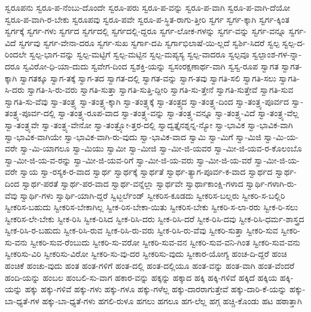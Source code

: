 {ಸ್ವರೂಪನು
ಸ್ವರೂ-ಪ-ನೆಂಬು-ದೊಂದೇ
ಸ್ವರೂ-ಪರು
ಸ್ವರೂ-ಪ-ವನ್ನು
ಸ್ವರೂ-ಪ-ವಾಗಿ
ಸ್ವರೂ-ಪ-ವಾಗಿ-ದೆಯೋ
ಸ್ವರೂ-ಪ-ವಾಗಿ-ರ-ಬೇಕು
ಸ್ವರೂಪವು
ಸ್ವರೂ-ಪವೇ
ಸ್ವರೂ-ಪ-ಸ್ಥಿತ-ರಾಗು-ತ್ತೀರಿ
ಸ್ವರ್ಗ
ಸ್ವರ್ಗ-ಕ್ಕಾಗಿ
ಸ್ವರ್ಗ-ಕ್ಕಿಂತ
ಸ್ವರ್ಗಕ್ಕೆ
ಸ್ವರ್ಗ-ಗಳು
ಸ್ವರ್ಗದ
ಸ್ವರ್ಗದಲ್ಲಿ
ಸ್ವರ್ಗದಲ್ಲಿ-ದ್ದರೂ
ಸ್ವರ್ಗ-ಲೋಕ-ಗಳನ್ನು
ಸ್ವರ್ಗ-ವನ್ನು
ಸ್ವರ್ಗ-ವನ್ನೂ
ಸ್ವರ್ಗ-ವಿದೆ
ಸ್ವರ್ಗವು
ಸ್ವರ್ಗ-ವೇನಾ-ದರೂ
ಸ್ವರ್ಗ-ಸುಖ
ಸ್ವರ್ಗಾ-ದಪಿ
ಸ್ವರ್ಗಾಭಿಲಾಷೆ-ಯಿ-ಲ್ಲದೆ
ಸ್ವರ್ಶಿ-ಸಿದರೆ
ಸ್ವಲ್ಪ
ಸ್ವಲ್ಪ-ದ-ರಿಂದಲೇ
ಸ್ವಲ್ಪ-ಭಾಗ-ವನ್ನು
ಸ್ವಲ್ಪ-ಮಟ್ಟಿಗೆ
ಸ್ವಲ್ಪ-ಮಟ್ಟಿನ
ಸ್ವಲ್ಪ-ಮಪ್ಯಸ್ಯ
ಸ್ವಲ್ಪ-ವಾದರೂ
ಸ್ವಲ್ಪವೂ
ಸ್ವಲ್ಪಾಂಶ-ಗಳ-ನ್ನಾ-ದರೂ
ಸ್ವವಿರೋ-ಧಿ-ಯಾ-ದುದು
ಸ್ವವೇಗ-ದಿಂದ
ಸ್ವಶಕ್ತಿ-ಯನ್ನು
ಸ್ವಸಂರಕ್ಷಣಾರ್ಥ-ವಾಗಿ
ಸ್ವಸ್ವ-ರೂಪ
ಸ್ವಾಗತ
ಸ್ವಾಗತ-ಕ್ಕಾಗಿ
ಸ್ವಾಗತಕ್ಕೂ
ಸ್ವಾಗ-ತಕ್ಕೆ
ಸ್ವಾಗ-ತದ
ಸ್ವಾಗತ-ದಲ್ಲಿ
ಸ್ವಾಗತ-ವನ್ನು
ಸ್ವಾಗ-ತವು
ಸ್ವಾಗತಿ-ಸಲಿ
ಸ್ವಾಗತಿ-ಸಲು
ಸ್ವಾಗತಿ-ಸಿ-ದರು
ಸ್ವಾಗತಿ-ಸಿ-ರು-ವರು
ಸ್ವಾಗತಿ-ಸುತ್ತಾ
ಸ್ವಾಗತಿ-ಸುತ್ತಿ-ದ್ದೀರಿ
ಸ್ವಾಗತಿ-ಸು-ತ್ತೇನೆ
ಸ್ವಾಗತಿ-ಸುತ್ತೇವೆ
ಸ್ವಾಗತಿ-ಸುವ
ಸ್ವಾಗತಿ-ಸು-ವೆವು
ಸ್ವಾ-ತಂತ್ರ್ಯ
ಸ್ವಾ-ತಂತ್ರ್ಯ-ಕ್ಕಾಗಿ
ಸ್ವಾ-ತಂತ್ರ್ಯಕ್ಕೆ
ಸ್ವಾ-ತಂತ್ರ್ಯದ
ಸ್ವಾ-ತಂತ್ರ್ಯ-ದಿಂದ
ಸ್ವಾ-ತಂತ್ರ್ಯ-ಪೂರ್ವದ
ಸ್ವಾ-ತಂತ್ರ್ಯ-ಪೂರ್ವ-ದಲ್ಲಿ
ಸ್ವಾ-ತಂತ್ರ್ಯ-ರೂಪ-ವಾದ
ಸ್ವಾ-ತಂತ್ರ್ಯ-ವನ್ನು
ಸ್ವಾ-ತಂತ್ರ್ಯ-ವನ್ನೂ
ಸ್ವಾ-ತಂತ್ರ್ಯ-ವಿದೆ
ಸ್ವಾ-ತಂತ್ರ್ಯ-ವೆಲ್ಲ
ಸ್ವಾ-ತಂತ್ರ್ಯವೇ
ಸ್ವಾ-ತಂತ್ರ್ಯ-ವೇನೋ
ಸ್ವಾ-ತಂತ್ರ್ಯೋ-ತ್ತರ-ದಲ್ಲಿ
ಸ್ವಾದ್ವತ್ತೈನಶ್ನನ್ನ-ನ್ಯೋ
ಸ್ವಾ-ಭಾವಿಕ
ಸ್ವಾ-ಭಾವಿಕ-ವಾಗಿ
ಸ್ವಾ-ಭಾವಿಕ-ವಾಗಿಯೇ
ಸ್ವಾ-ಭಾವಿಕ-ವಾಗಿ-ರು-ವುದು
ಸ್ವಾ-ಭಾವಿಕ-ವಾದ
ಸ್ವಾಮಿ
ಸ್ವಾ-ಮಿಗೆ
ಸ್ವಾ-ಮಿಜಿ
ಸ್ವಾ-ಮಿ-ಯ-ವರೇ
ಸ್ವಾ-ಮಿ-ಯಾಗಲೂ
ಸ್ವಾ-ಮಿಯು
ಸ್ವಾಮೀ
ಸ್ವಾ-ಮೀಜಿ
ಸ್ವಾ-ಮೀ-ಜಿ-ಯವರ
ಸ್ವಾ-ಮೀ-ಜಿ-ಯವ-ರ-ಕೊಲಂಬೊ
ಸ್ವಾ-ಮೀ-ಜಿ-ಯ-ವ-ರನ್ನು
ಸ್ವಾ-ಮೀ-ಜಿ-ಯವ-ರಿಗೆ
ಸ್ವಾ-ಮೀ-ಜಿ-ಯ-ವರು
ಸ್ವಾ-ಮೀ-ಜಿ-ಯ-ವರೆ
ಸ್ವಾ-ಮೀ-ಜಿ-ಯ-ವರೇ
ಸ್ವಾಯ
ಸ್ವಾ-ರಸ್ಯಕ-ರ-ವಾದ
ಸ್ವಾರ್ಥ
ಸ್ವಾರ್ಥಕ್ಕೆ
ಸ್ವಾರ್ಥತೆ
ಸ್ವಾರ್ಥ-ತ್ಯಾಗ-ಪೂರ್ವ-ಕ-ವಾದ
ಸ್ವಾರ್ಥದ
ಸ್ವಾರ್ಥ-ದಿಂದ
ಸ್ವಾರ್ಥ-ಪರತೆ
ಸ್ವಾರ್ಥ-ಪರ-ವಾದ
ಸ್ವಾರ್ಥ-ವನ್ನೆಲ್ಲಾ
ಸ್ವಾರ್ಥವೇ
ಸ್ವಾರ್ಥಾಕಾಂಕ್ಷಿ-ಗಳಾದ
ಸ್ವಾರ್ಥಿ-ಗಳಾಗಿ-ರು-ವೆವು
ಸ್ವಾರ್ಥಿ-ಗಳು
ಸ್ವಾರ್ಥಿ-ಯಾಗಿ-ದ್ದರೆ
ಸ್ವಿಟ್ಜರ್ಲೆಂಡ್
ಸ್ವೀಕರಿಸ-ಕೂಡದು
ಸ್ವೀಕರಿಸ-ಬಲ್ಲರು
ಸ್ವೀಕರಿ-ಸ-ಬಲ್ಲಿರಿ
ಸ್ವೀಕರಿಸ-ಬಹುದು
ಸ್ವೀಕರಿಸ-ಬೇಕಾಗಿಲ್ಲ
ಸ್ವೀಕ-ರಿಸ-ಬೇಕಾ-ಯಿತು
ಸ್ವೀಕರಿಸ-ಬೇಕು
ಸ್ವೀಕರಿ-ಸ-ಲಾ-ರರು
ಸ್ವೀಕ-ರಿ-ಸಲು
ಸ್ವೀಕರಿಸ-ಲೇ-ಬೇಕು
ಸ್ವೀಕ-ರಿಸಿ
ಸ್ವೀಕ-ರಿಸಿದ
ಸ್ವೀಕ-ರಿಸಿ-ದರು
ಸ್ವೀಕ-ರಿಸಿ-ದರೆ
ಸ್ವೀಕ-ರಿಸಿ-ದವು
ಸ್ವೀಕ-ರಿಸಿ-ಧರ್ಮ-ಶಾಸ್ತ್ರದ
ಸ್ವೀಕ-ರಿಸಿ-ರ-ಬಹುದು
ಸ್ವೀಕ-ರಿಸಿ-ರುವ
ಸ್ವೀಕ-ರಿಸಿ-ರು-ವರು
ಸ್ವೀಕ-ರಿಸಿ-ರು-ವೆವು
ಸ್ವೀಕರಿ-ಸುತ್ತಾ
ಸ್ವೀಕರಿ-ಸುವ
ಸ್ವೀಕರಿ-ಸು-ವನು
ಸ್ವೀಕರಿ-ಸುವ-ರೆಂಬುದು
ಸ್ವೀಕರಿ-ಸು-ವರೋ
ಸ್ವೀಕರಿ-ಸುವ-ವನ
ಸ್ವೀಕರಿ-ಸುವ-ವನಿ-ಗಿಂತ
ಸ್ವೀಕರಿ-ಸುವ-ವನು
ಸ್ವೀಕರಿಸು-ವಿರಿ
ಸ್ವೀಕರಿಸು-ವಿರೋ
ಸ್ವೀಕರಿ-ಸು-ವು-ದರ
ಸ್ವೀಕರಿಸು-ವುದು
ಸ್ವೀಕಾರ-ಯೋಗ್ಯ
ಹಂಚ-ದಿ-ದ್ದರೆ
ಹಂಚಿ
ಹಂಚಿಕೆ
ಹಂಚು-ವುದು
ಹಂತ
ಹಂತ-ಗಳಿಗೆ
ಹಂತ-ದಲ್ಲಿ
ಹಂತ-ದಲ್ಲಿಯೂ
ಹಂತ-ವನ್ನು
ಹಂತ-ವಾಗಿ
ಹಂತ-ವೆಂದರೆ
ಹಂದಿ-ಯನ್ನು
ಹಂಬಲ
ಹಂಬಲಿ-ಸು-ವಾಗ
ಹಕಾರ-ವನ್ನು
ಹಕ್ಕನ್ನು
ಹಕ್ಕಾದ
ಹಕ್ಕಿ
ಹಕ್ಕಿ-ಗಳಿವೆ
ಹಕ್ಕಿದೆ
ಹಕ್ಕಿಯ
ಹಕ್ಕಿ-ಯನ್ನು
ಹಕ್ಕು
ಹಕ್ಕು-ಗಳಿವೆ
ಹಕ್ಕು-ಗಳು
ಹಕ್ಕು-ಗಳೂ
ಹಕ್ಕು-ಗಳೆಲ್ಲ
ಹಕ್ಕು-ದಾರರಾಗುತ್ತೇವೆ
ಹಕ್ಕು-ದಾರಿ-ಕೆ-ಯನ್ನು
ಹಕ್ಕು-ಬಾ-ಧ್ಯತೆ-ಗಳ
ಹಕ್ಕು-ಬಾ-ಧ್ಯತೆ-ಗಳು
ಹಗಲಿ-ರುಳೂ
ಹಗಲು
ಹಗಲೂ
ಹಗ-ಲೆಲ್ಲ
ಹಗ್ಗ
ಹಚ್ಚಿ-ಕೊಂಡು
ಹಟ
ಹಠಾತ್ತಾಗಿ
}
